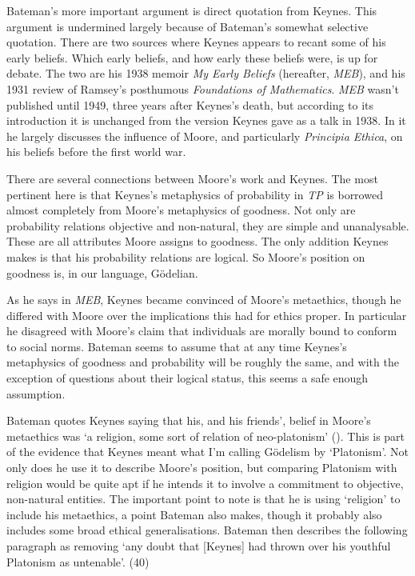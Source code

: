 \documentclass[
  11pt,
  letterpaper,
  DIV=11,
  numbers=noendperiod,
  twoside]{scrartcl}
\begin{document}
Bateman's more important argument is direct quotation from Keynes. This
argument is undermined largely because of Bateman's somewhat selective
quotation. There are two sources where Keynes appears to recant some of
his early beliefs. Which early beliefs, and how early these beliefs
were, is up for debate. The two are his 1938 memoir \emph{My Early
Beliefs} (hereafter, \emph{MEB}), and his 1931 review of Ramsey's
posthumous \emph{Foundations of Mathematics}. \emph{MEB} wasn't
published until 1949, three years after Keynes's death, but according to
its introduction it is unchanged from the version Keynes gave as a talk
in 1938. In it he largely discusses the influence of Moore, and
particularly \emph{Principia Ethica}, on his beliefs before the first
world war.

There are several connections between Moore's work and Keynes. The most
pertinent here is that Keynes's metaphysics of probability in \emph{TP}
is borrowed almost completely from Moore's metaphysics of goodness. Not
only are probability relations objective and non-natural, they are
simple and unanalysable. These are all attributes Moore assigns to
goodness. The only addition Keynes makes is that his probability
relations are logical. So Moore's position on goodness is, in our
language, Gödelian.

As he says in \emph{MEB}, Keynes became convinced of Moore's metaethics,
though he differed with Moore over the implications this had for ethics
proper. In particular he disagreed with Moore's claim that individuals
are morally bound to conform to social norms. Bateman seems to assume
that at any time Keynes's metaphysics of goodness and probability will
be roughly the same, and with the exception of questions about their
logical status, this seems a safe enough assumption.

Bateman quotes Keynes saying that his, and his friends', belief in
Moore's metaethics was `a religion, some sort of relation of
neo-platonism' (). This is
part of the evidence that Keynes meant what I'm calling Gödelism by
`Platonism'. Not only does he use it to describe Moore's position, but
comparing Platonism with religion would be quite apt if he intends it to
involve a commitment to objective, non-natural entities. The important
point to note is that he is using `religion' to include his metaethics,
a point Bateman also makes, though it probably also includes some broad
ethical generalisations. Bateman then describes the following paragraph
as removing `any doubt that {[}Keynes{]} had thrown over his youthful
Platonism as untenable'. (40)
\end{document}

